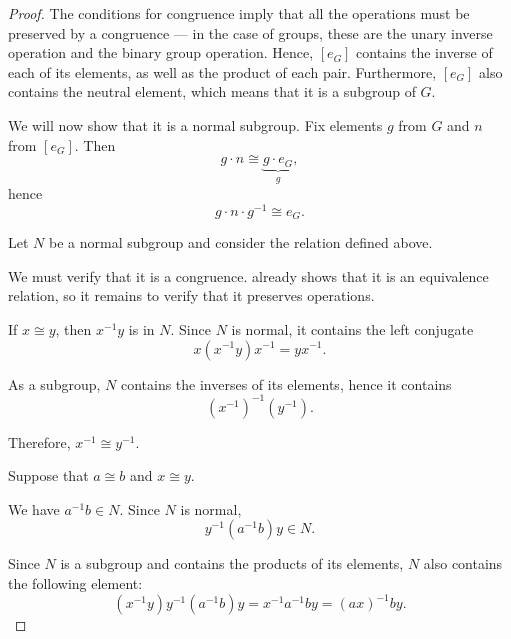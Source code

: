 \begin{proof}
   The conditions for congruence imply that all the operations must be preserved by a congruence --- in the case of groups, these are the unary inverse operation and the binary group operation. Hence, \( [e_G] \) contains the inverse of each of its elements, as well as the product of each pair. Furthermore, \( [e_G] \) also contains the neutral element, which means that it is a subgroup of \( G \).

  We will now show that it is a normal subgroup. Fix elements \( g \) from \( G \) and \( n \) from \( [e_G] \). Then
  \begin{equation*}
    g \cdot n \cong \underbrace{g \cdot e_G}_{g},
  \end{equation*}
  hence
  \begin{equation*}
    g \cdot n \cdot g^{-1} \cong e_G.
  \end{equation*}

   Let \( N \) be a normal subgroup and consider the relation {\cong} defined above.

  We must verify that it is a congruence.  already shows that it is an equivalence relation, so it remains to verify that it preserves operations.

   If \( x \cong y \), then \( x^{-1} y \) is in \( N \). Since \( N \) is normal, it contains the left conjugate
  \begin{equation*}
    x (x^{-1} y) x^{-1} = y x^{-1}.
  \end{equation*}

  As a subgroup, \( N \) contains the inverses of its elements, hence it contains
  \begin{equation*}
    (x^{-1})^{-1} (y^{-1}).
  \end{equation*}

  Therefore, \( x^{-1} \cong y^{-1} \).

   Suppose that \( a \cong b \) and \( x \cong y \).

  We have \( a^{-1} b \in N \). Since \( N \) is normal,
  \begin{equation*}
    y^{-1} (a^{-1} b) y \in N.
  \end{equation*}

  Since \( N \) is a subgroup and contains the products of its elements, \( N \) also contains the following element:
  \begin{equation*}
    (x^{-1} y) y^{-1} (a^{-1} b) y = x^{-1} a^{-1} b y = (a x)^{-1} b y.
  \end{equation*}


\end{proof}
